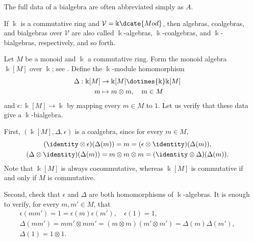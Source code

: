 The full data of a bialgebra are often abbreviated simply as $A$.

If $\Bbbk$ is a commutative ring and
$\mathcal{V}=\Bbbk\dcate{Mod}$, then algebras, coalgebras, and bialgebras
over $\mathcal{V}$ are also called $\Bbbk$-algebras, $\Bbbk$-coalgebras,
and $\Bbbk$-bialgebras, respectively, and so forth.

\begin{example}\label{eg:monoid-bialgebra}
	Let $M$ be a monoid and $\Bbbk$ a commutative ring. Form the monoid algebra
	$\Bbbk[M]$ over $\Bbbk$; see \cite[Definition 5.6.1]{Li1}. Define the
	$\Bbbk$-module homomorphism
	\begin{align*}
		\Delta: \Bbbk[M] & \to \Bbbk[M] \dotimes{\Bbbk} \Bbbk[M] \\
		m & \mapsto m \otimes m, \quad m \in M
	\end{align*}
	and $\epsilon:\Bbbk[M]\to\Bbbk$ by mapping every $m\in M$ to $1$. Let
	us verify that these data give a $\Bbbk$-bialgebra.

	First, $(\Bbbk[M],\Delta,\epsilon)$ is a coalgebra, since for every
	$m\in M$,
	\begin{gather*}
		(\identity \otimes \epsilon)(\Delta(m)) = m = (\epsilon \otimes \identity)(\Delta(m)), \\
		(\Delta \otimes \identity)(\Delta(m)) = m \otimes m \otimes m = (\identity \otimes \Delta)(\Delta(m)).
	\end{gather*}
	Note that $\Bbbk[M]$ is always cocommutative, whereas $\Bbbk[M]$ is
	commutative if and only if $M$ is commutative.

	Second, check that $\epsilon$ and $\Delta$ are both homomorphisms of
	$\Bbbk$-algebras. It is enough to verify, for every $m,m'\in M$, that
	\begin{gather*}
		\epsilon(mm') = 1 = \epsilon(m)\epsilon(m'), \quad \epsilon(1) = 1, \\
		\Delta(mm') = mm' \otimes mm' = (m \otimes m)(m' \otimes m') = \Delta(m) \Delta(m'), \\
		\Delta(1) = 1 \otimes 1.
	\end{gather*}
\end{example}

